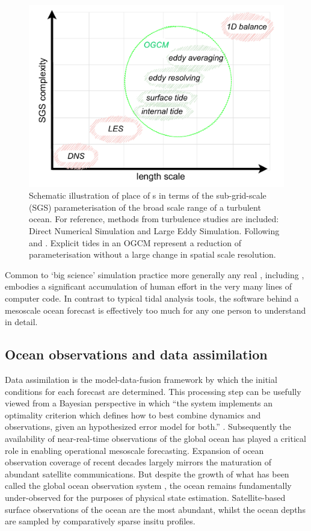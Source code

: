\begin{figure}[h]\centering
  \includegraphics[width=\figwidthBig]{figures/diagrams/ogcm_scales.pdf}
  \caption{Schematic illustration of place of \OGCM{}s in terms of the sub-grid-scale (SGS) parameterisation of the broad scale range of a turbulent ocean.  For reference, methods from turbulence studies are included: Direct Numerical Simulation and Large Eddy Simulation. Following \citep[fig 5.2]{Petersen:2012tr} and \citep{Stevens:2001kb}.  Explicit tides in an OGCM represent a reduction of parameterisation without a large change in spatial scale resolution.}
  \label{fig:ogcmScales}
\end{figure}
Common to `big science' simulation practice more generally \citep{Petersen:2012tr} any real \OGCM{}, including \BL{}, embodies a significant accumulation of human effort in the very many lines of computer code.  In contrast to typical tidal analysis tools, the software behind a mesoscale ocean forecast is effectively too much for any one person to understand in detail.
\subsection{Ocean observations and data assimilation}
Data assimilation is the model-data-fusion framework by which the initial conditions for each \OCGM{} forecast are determined.
This processing step can be usefully viewed from a Bayesian perspective in which ``the system implements an optimality criterion which defines how to best combine dynamics and observations, given an hypothesized error model for both.'' \citep{10.1007/978-94-007-0332-2_13}.
Subsequently the availability of near-real-time observations of the global ocean has played a critical role in enabling operational mesoscale forecasting.  Expansion of ocean observation coverage of recent decades largely mirrors the maturation of abundant satellite communications.  But despite the growth of what has been called the global ocean observation system \GOOS{} \citep{Komen:1999ch}, the ocean remains fundamentally under-observed for the purposes of physical state estimation.   Satellite-based surface observations of the ocean are the most abundant, whilst the ocean depths are sampled by comparatively sparse insitu profiles.

